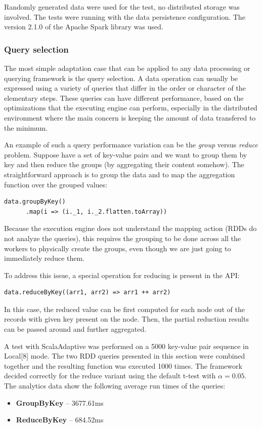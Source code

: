 Randomly generated data were used for the test, no distributed storage was involved. The tests were running with the  data persistence configuration. The version 2.1.0 of the Apache Spark library was used.

\subsubsection{Query selection}

The most simple adaptation case that can be applied to any data processing or querying framework is the query selection. A data operation can usually be expressed using a variety of queries that differ in the order or character of the elementary steps. These queries can have different performance, based on the optimizations that the executing engine can perform, especially in the distributed environment where the main concern is keeping the amount of data transfered to the minimum.

An example of such a query performance variation can be the \textit{group} versus \textit{reduce} problem. Suppose have a set of key-value pairs and we want to group them by key and then reduce the groups (by aggregating their content somehow). The straightforward approach is to group the data and to map the aggregation function over the grouped values:

\lstset{style=Scala}
\begin{lstlisting}
data.groupByKey()
      .map(i => (i._1, i._2.flatten.toArray))
\end{lstlisting}

Because the execution engine does not understand the mapping action (RDDs do not analyze the queries), this requires the grouping to be done across all the workers to physically create the groups, even though we are just going to immediately reduce them. 

To address this issue, a special operation for reducing is present in the API:

\lstset{style=Scala}
\begin{lstlisting}
data.reduceByKey((arr1, arr2) => arr1 ++ arr2)
\end{lstlisting}

In this case, the reduced value can be first computed for each node out of the records with given key present on the node. Then, the partial reduction results can be passed around and further aggregated.

A test with ScalaAdaptive was performed on a 5000 key-value pair sequence in Local[8] mode. The two RDD queries presented in this section were combined together and the resulting function was executed 1000 times. The framework decided correctly for the reduce variant using the default t-test with $\alpha = 0.05$. The analytics data show the following average run times of the queries:
\begin{itemize}
	\item \textbf{GroupByKey} -- 3677.61ms
	\item \textbf{ReduceByKey} -- 684.52ms
\end{itemize}

